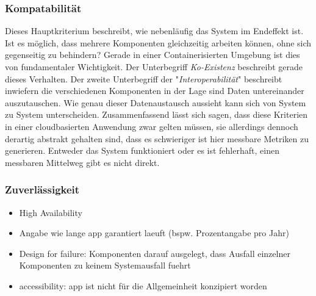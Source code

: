 \subsubsection{Kompatabilität}
Dieses Hauptkriterium beschreibt, wie nebenläufig das System im Endeffekt ist. Ist es möglich, dass mehrere Komponenten gleichzeitig arbeiten können, ohne sich gegenseitig zu behindern? Gerade in einer Containerisierten Umgebung ist dies von fundamentaler Wichtigkeit. Der Unterbegriff \emph{Ko-Existenz} beschreibt gerade dieses Verhalten. Der zweite Unterbegriff der "\emph{Interoperabilität}" beschreibt inwiefern die verschiedenen Komponenten in der Lage sind Daten untereinander auszutauschen. Wie genau dieser Datenaustausch aussieht kann sich von System zu System unterscheiden. Zusammenfassend lässt sich sagen, dass diese Kriterien in einer cloudbasierten Anwendung zwar gelten müssen, sie allerdings dennoch derartig abstrakt gehalten sind, dass es schwieriger ist hier messbare Metriken zu generieren. Entweder das System funktioniert oder es ist fehlerhaft, einen messbaren Mittelweg gibt es nicht direkt.

\subsubsection{Zuverlässigkeit}
\begin{itemize}
  \item High Availability
  \item Angabe wie lange app garantiert laeuft (bspw. Prozentangabe pro Jahr)
  \item Design for failure: Komponenten darauf ausgelegt, dass Ausfall einzelner Komponenten zu keinem Systemausfall fuehrt
  \item accessibility: app ist nicht für die Allgemeinheit konzipiert worden
\end{itemize}

